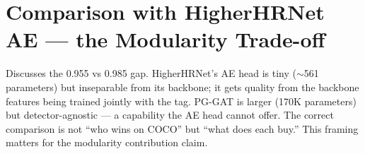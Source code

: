 \section{Comparison with HigherHRNet AE --- the Modularity Trade-off}
\label{sec_disc_modularity}

Discusses the 0.955 vs 0.985 gap. HigherHRNet's AE head is tiny ($\sim$561 parameters) but inseparable from its backbone; it gets quality from the backbone features being trained jointly with the tag. PG-GAT is larger (170K parameters) but detector-agnostic --- a capability the AE head cannot offer. The correct comparison is not ``who wins on COCO'' but ``what does each buy.'' This framing matters for the modularity contribution claim.
